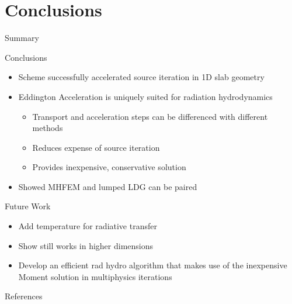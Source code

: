 \documentclass[10pt]{beamer}
\begin{document}
\section{Conclusions}

\begin{frame}{Summary}

	\onslide<+->
	Conclusions
	\begin{itemize} \vspace{-.1in}
		\item Scheme successfully accelerated source iteration in 1D slab geometry

		\item Eddington Acceleration is uniquely suited for radiation hydrodynamics 
		\begin{itemize}
			\item Transport and acceleration steps can be differenced with different methods 
			\item Reduces expense of source iteration 
			\item Provides inexpensive, conservative solution 
		\end{itemize}

		\item Showed MHFEM and lumped LDG can be paired 

	\end{itemize}

	\onslide<+->
	Future Work 
	\begin{itemize} \vspace{-.1in}

		\item Add temperature for radiative transfer 

		\item Show still works in higher dimensions 

		\item Develop an efficient rad hydro algorithm that makes use of the inexpensive Moment solution in multiphysics iterations 

	\end{itemize}

\end{frame}

\appendix

\begin{frame}{References}

	\nocite{adams,morel,llnl,alcouffe,mhfem,hydro,bolding,nonlinearAccel}
	
	

\end{frame}
\end{document}
